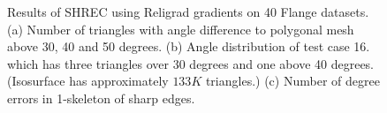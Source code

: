 \begin{figure}[tp]
\centering	


\caption{Results of SHREC using Religrad gradients on 40 Flange datasets. 
(a) Number of triangles with angle difference 
to polygonal mesh above 30, 40 and 50 degrees. 
(b) Angle distribution of test case 16.
which has three triangles over 30 degrees and one above 40
degrees. (Isosurface has approximately $133K$ triangles.)
(c) Number of degree errors in 1-skeleton of sharp edges.
}

\label{fig:flangeAngle}

\vspace{4em}


\end{figure}
